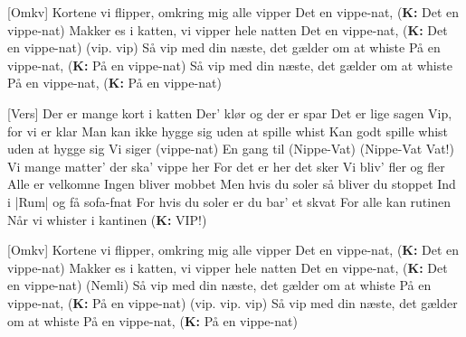 \documentclass[a4paper,11pt]{article}
\begin{document}
\begin{song}
    [Omkv] Kortene vi flipper, omkring mig alle vipper
                Det en vippe-nat, (\textbf{K:} Det en vippe-nat)
                Makker es i katten, vi vipper hele natten
                Det en vippe-nat, (\textbf{K:} Det en vippe-nat) (vip. vip)
                Så vip med din næste, det gælder om at whiste
                På en vippe-nat, (\textbf{K:} På en vippe-nat) 
                Så vip med din næste, det gælder om at whiste
                På en vippe-nat, (\textbf{K:} På en vippe-nat)

    [Vers] Der er mange kort i katten
                Der' klør og der er spar
                Det er lige sagen
                Vip, for vi er klar
                Man kan ikke hygge sig uden at spille whist
                Kan godt spille whist uden at hygge sig
                Vi siger (vippe-nat)
                En gang til 
                (Nippe-Vat)
                (Nippe-Vat Vat!)
                Vi mange matter' der ska' vippe her
                For det er her det sker
                Vi bliv' fler og fler
                Alle er velkomne
                Ingen bliver mobbet
                Men hvis du soler så bliver du stoppet
                Ind i |Rum| og få sofa-fnat
                For hvis du soler er du bar' et skvat
                For alle kan rutinen 
                Når vi whister i kantinen  (\textbf{K:} VIP!)

    [Omkv] Kortene vi flipper, omkring mig alle vipper
                Det en vippe-nat, (\textbf{K:} Det en vippe-nat)
                Makker es i katten, vi vipper hele natten
                Det en vippe-nat, (\textbf{K:} Det en vippe-nat) (Nemli)
                Så vip med din næste, det gælder om at whiste
                På en vippe-nat, (\textbf{K:} På en vippe-nat) (vip. vip. vip)
                Så vip med din næste, det gælder om at whiste
                På en vippe-nat, (\textbf{K:} På en vippe-nat)
\end{song}
\end{document}
